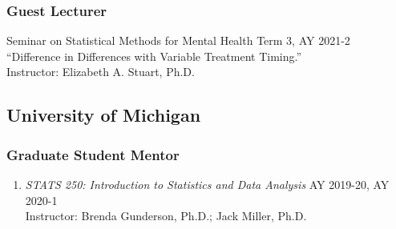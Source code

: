 \documentclass[letterpaper,11pt]{article} %
\begin{document}
	\subsubsection*{Guest Lecturer}
	\begin{etaremune}
		\item Seminar on Statistical Methods for Mental Health \hfill Term 3, AY 2021-2 \\
		``Difference in Differences with Variable Treatment Timing.'' \\
		Instructor: Elizabeth A. Stuart, Ph.D.
	\end{etaremune}
	
	\subsection*{University of Michigan}
	
	\subsubsection*{Graduate Student Mentor}
	\begin{enumerate}
		\item \textit{STATS 250: Introduction to Statistics and Data Analysis} \hfill AY 2019-20, AY 2020-1 \\
		Instructor: Brenda Gunderson, Ph.D.; Jack Miller, Ph.D.
	\end{enumerate}
	
\end{document}
